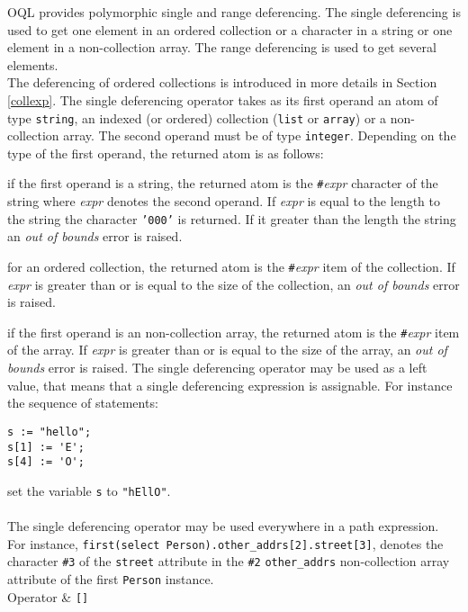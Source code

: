\label{arraydef}
OQL provides polymorphic single and range deferencing. The single deferencing
is used to get one element in an ordered collection or a character in a string
or one element in a non-collection array. The range deferencing is used to
get several elements.\\
The deferencing of ordered collections is introduced in more details
in Section \ref{collexp}.
The single deferencing operator takes as its first operand an atom of type
\texttt{string}, an indexed 
(or ordered) collection (\texttt{list} or \texttt{array})
or a non-collection array. The second operand must be of type \texttt{integer}.
Depending on the type of the first operand, the returned atom
is as follows:
\be
\item if the first operand is a string,
the returned atom is the \texttt{\#}\emph{expr} character of the string
where \emph{expr} denotes the second operand.
If \emph{expr} is equal to the length to the string the character
\texttt{'{\bks}000'} is returned. If it greater than the length the
string an \emph{out of bounds} error is raised.
\item for an ordered collection, the returned atom is the
\texttt{\#}\emph{expr} item of the collection. If \emph{expr} is greater
than or is equal to the size of the collection, an
\emph{out of bounds} error is raised.
\item if the first operand is an non-collection array, the returned atom is the
\texttt{\#}\emph{expr} item of the array. If \emph{expr} is greater
than or is equal to the size of the array, an
\emph{out of bounds} error is raised.
\ee
The single deferencing operator may be used as a left value, that means that a single
deferencing expression is assignable. For instance the sequence of
statements:
\verbsize
\begin{verbatim}
s := "hello";
s[1] := 'E';
s[4] := 'O';
\end{verbatim}
\normalsize
set the variable \texttt{s} to \texttt{"hEllO"}.
\\
\\
The single deferencing operator may be used everywhere in a path expression.
For instance, \texttt{first(select Person).other\_addrs[2].street[3]},
denotes the character \texttt{\#3} of the \texttt{street} attribute
in the \texttt{\#2} \texttt{other\_addrs} non-collection array attribute of
the first \texttt{Person} instance.
\geninfo\\
\hline Operator & \texttt{[]} \\
